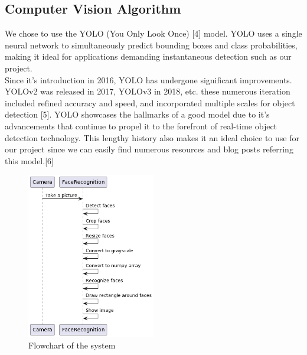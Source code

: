 \subsection{Computer Vision Algorithm}
\label{subsec:Computer Vision Algorithm - YOLOv6}
We chose to use the YOLO (You Only Look Once) [4] model. YOLO uses a single neural network to simultaneously predict bounding boxes and class probabilities, making it ideal for applications demanding instantaneous detection such as our project. \\
Since it's introduction in 2016, YOLO has undergone significant improvements. YOLOv2 was released in 2017, YOLOv3 in 2018, etc. these numerous iteration included refined accuracy and speed, and incorporated multiple scales for object detection [5]. YOLO showcases the hallmarks of a good model due to it's advancements that continue to propel it to the forefront of real-time object detection technology. This lengthy history also makes it an ideal choice to use for our project since we can easily find numerous resources and blog posts referring this model.[6]\\
\begin{figure}[h]
    \centering
    \includegraphics[width=0.5\textwidth]{images/Diagram-1.png}
    \caption{Flowchart of the system}
    \label{fig:flowchart}
\end{figure}

